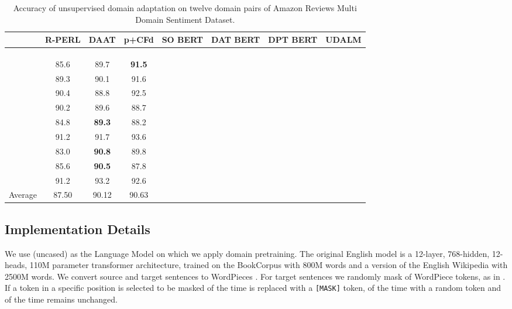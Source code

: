 \documentclass[11pt]{article}
\begin{document}
\begin{table*}[ht]
\centering
\small
\begin{tabular}{||l| c c c | c c c c||}
\hline
                    & R-PERL & DAAT & p+CFd & SO BERT & DAT BERT & DPT BERT & UDALM \\
\hline
     &  &  &  &  &  &  &  \\
     &  &  &  &  &  &  &  \\
     &  &  &  &  &  &  &  \\
     & 85.6 & 89.7 & \textbf{91.5} &  &  &  &  \\
     & 89.3 & 90.1 & 91.6 &  &  &  &  \\
     & 90.4 & 88.8 & 92.5 &  &  &  &  \\
     & 90.2 & 89.6 & 88.7 &  &  &  &  \\
     & 84.8 & \textbf{89.3} & 88.2 &  &  &  &  \\
     & 91.2 & 91.7 & 93.6 &  &  &  &  \\
     & 83.0 & \textbf{90.8} & 89.8 &  &  &  &  \\
     & 85.6 & \textbf{90.5} & 87.8 &  &  &  &  \\
     & 91.2 & 93.2 & 92.6 &  &  &  &  \\
    \hline
    Average & 87.50 & 90.12 & 90.63 &  &  &  &   \\
    \hline
\end{tabular}
\caption{Accuracy of unsupervised domain adaptation on twelve domain pairs of Amazon Reviews Multi Domain Sentiment Dataset.}
\label{tab:results}
\end{table*}

\subsection{Implementation Details}

We use  (uncased) as the Language Model on which we apply domain pretraining. The  original English model is a 12-layer, 768-hidden, 12-heads, 110M parameter transformer architecture, trained on the BookCorpus with 800M words and a version of the English Wikipedia with 2500M words.
We convert source and target sentences to WordPieces \citep{wu2016google}. For target sentences we randomly mask  of WordPiece tokens, as in \citep{devlin-etal-2019-bert}. If a token in a specific position is selected to be masked  of the time is replaced with a \texttt{[MASK]} token,  of the time with a random token and  of the time remains unchanged.
\end{document}
